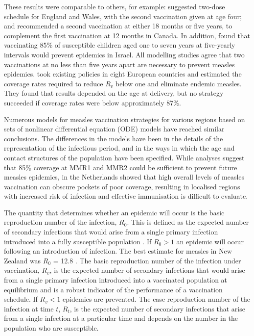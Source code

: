 \documentclass{article}
\begin{document}
\begin{itemize}
These results were comparable to others, for example: \citep{babad95} suggested two-dose schedule for England and Wales, with the second vaccination given at age four; and \citep{gay98} recommended a second vaccination at either 18 months or five years, to complement the first vaccination at 12 months in Canada. In addition, \citep{agur93} found that vaccinating 85\% of susceptible children aged one to seven years at five-yearly intervals would prevent epidemics in Israel. All modelling studies agree that two vaccinations at no less than five years apart are necessary to prevent measles epidemics. \citep{wallinga1} took existing policies in eight European countries and estimated the coverage rates required to reduce $R_v$ below one and eliminate endemic measles. They found that results depended on the age at delivery, but no strategy succeeded if coverage rates were below approximately 87\%.

Numerous models for measles vaccination strategies for various regions \citep{agur93, babad95, edmunds0, gay98, wallinga1} based on sets of nonlinear differential equation (ODE) models have reached similar conclusions. The differences in the models have been in the details of the representation of the infectious period, and in the ways in which the age and contact structures of the population have been specified. While analyses suggest that 85\% coverage at MMR1 and MMR2 could be sufficient to prevent future measles epidemics, \citep{glass4} in the Netherlands showed that high overall levels of measles vaccination can obscure pockets of poor coverage, resulting in localised regions with increased risk of infection and effective immunisation is difficult to evaluate. 

The quantity that determines whether an epidemic will occur is the basic reproduction number of the infection, $R_0$. This is defined as the expected number of secondary infections that would arise from a single primary infection introduced into a fully susceptible population \citep{anderson91, diekmann0}. If $R_0 > 1$ an epidemic will occur following an introduction of infection. The best estimate for measles in New Zealand was $R_0$ = 12.8 \citep{roberts4}. The basic reproduction number of the infection under vaccination, $R_v$, is the expected number of secondary infections that would arise from a single primary infection introduced into a vaccinated population at equilibrium and is a robust indicator of the performance of a vaccination schedule. If $R_v < 1$ epidemics are prevented. The case reproduction number of the infection at time $t$, $R_t$, is the expected number of secondary infections that arise from a single infection at a particular time and depends on the number in the population who are susceptible.


\end{itemize}
\end{document}

